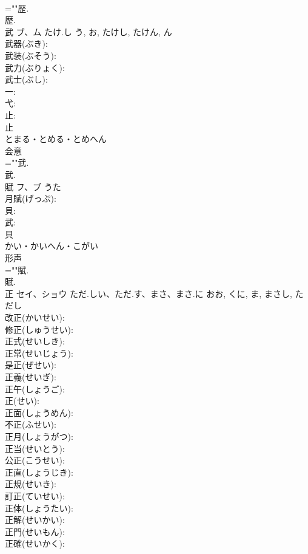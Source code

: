 \documentclass[8pt]{extreport}
\begin{document}
\begin{CJK}{UTF8}{min}
\\	=""歴.
\\	歴.
\\	武	ブ、ム	たけ.し	う, お, たけし, たけん, ん	
\\	武器(ぶき): 
\\	武装(ぶそう): 
\\	武力(ぶりょく): 
\\	武士(ぶし): 
\\	一: 
\\	弋: 
\\	止: 
\\	止	
\\	とまる・とめる・とめへん	
\\	会意 
\\	=""武.
\\	武.
\\	賦	フ、ブ		うた	
\\	月賦(げっぷ): 
\\	貝: 
\\	武: 
\\	貝	
\\	かい・かいへん・こがい	
\\	形声 
\\	=""賦.
\\	賦.
\\	正	セイ、ショウ	ただ.しい、ただ.す、まさ、まさ.に	おお, くに, ま, まさし, ただし	
\\	改正(かいせい): 
\\	修正(しゅうせい): 
\\	正式(せいしき): 
\\	正常(せいじょう): 
\\	是正(ぜせい): 
\\	正義(せいぎ): 
\\	正午(しょうご): 
\\	正(せい): 
\\	正面(しょうめん): 
\\	不正(ふせい): 
\\	正月(しょうがつ): 
\\	正当(せいとう): 
\\	公正(こうせい): 
\\	正直(しょうじき): 
\\	正規(せいき): 
\\	訂正(ていせい): 
\\	正体(しょうたい): 
\\	正解(せいかい): 
\\	正門(せいもん): 
\\	正確(せいかく): 

\end{CJK}
\end{document}
